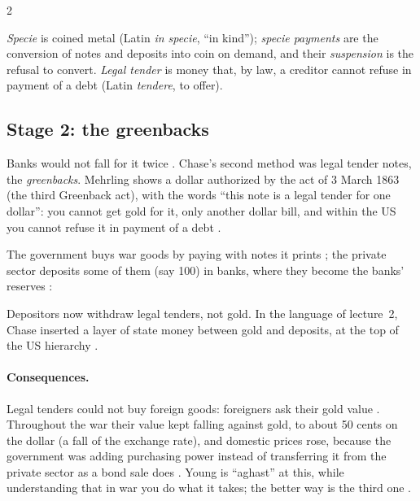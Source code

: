 \begin{paracol}{2}
\begin{definition}
\emph{Specie} is coined metal (Latin \emph{in specie}, ``in kind''); \emph{specie payments} are the conversion of notes and deposits into
coin on demand, and their \emph{suspension} is the refusal to convert. \emph{Legal tender} is money that, by law, a creditor cannot
refuse in payment of a debt (Latin \emph{tendere}, to offer).
\end{definition}

\subsection{Stage 2: the greenbacks}
Banks would not fall for it twice . Chase's second method was legal tender notes, the \emph{greenbacks}. Mehrling
shows a dollar authorized by the act of 3 March 1863 (the third Greenback act), with the words ``this note is a legal tender for one
dollar'': you cannot get gold for it, only another dollar bill, and within the US you cannot refuse it in payment of a debt
.

The government buys war goods by paying with notes it prints ; the private sector deposits
some of them (say 100) in banks, where they become the banks' reserves :
\begin{taccts}
\quad
{}\quad
{}
\end{taccts}
Depositors now withdraw legal tenders, not gold. In the language of lecture~2, Chase inserted a layer of state money between gold and
deposits, at the top of the US hierarchy .

\paragraph{Consequences.} Legal tenders could not buy foreign goods: foreigners ask their gold value . Throughout the
war their value kept falling against gold, to about 50 cents on the dollar (a fall of the exchange rate), and domestic prices rose,
because the government was adding purchasing power instead of transferring it from the private sector as a bond sale does
. Young is ``aghast'' at this, while understanding that in war you do what it takes; the
better way is the third one .


\end{paracol}
